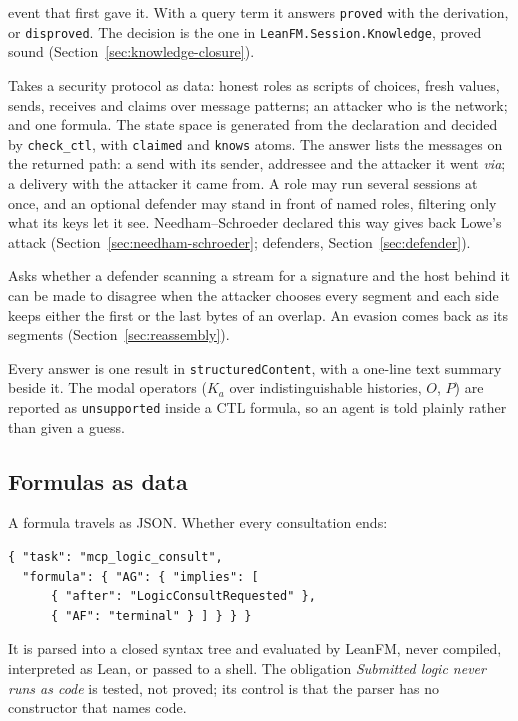 \begin{description}[style=nextline]
event that first gave it. With a query term it answers \texttt{proved} with the
derivation, or \texttt{disproved}. The decision is the one in
\texttt{LeanFM.Session.Knowledge}, proved sound
(Section~\ref{sec:knowledge-closure}).
\item[\texttt{check\_protocol}] Takes a security protocol as data: honest roles
as scripts of choices, fresh values, sends, receives and claims over message
patterns; an attacker who is the network; and one formula. The state space is
generated from the declaration and decided by \texttt{check\_ctl}, with
\texttt{claimed} and \texttt{knows} atoms. The answer lists the messages on the
returned path: a send with its sender, addressee and the attacker it went
\emph{via}; a delivery with the attacker it came from. A role may run several
sessions at once, and an optional defender may stand in front of named roles,
filtering only what its keys let it see. Needham--Schroeder declared this way
gives back Lowe's attack (Section~\ref{sec:needham-schroeder}; defenders,
Section~\ref{sec:defender}).
\item[\texttt{check\_reassembly}] Asks whether a defender scanning a stream for a
signature and the host behind it can be made to disagree when the attacker
chooses every segment and each side keeps either the first or the last bytes of
an overlap. An evasion comes back as its segments
(Section~\ref{sec:reassembly}).
\end{description}

Every answer is one result in \texttt{structuredContent}, with a one-line text
summary beside it. The modal operators ($K_a$ over indistinguishable histories,
$O$, $P$) are reported as \texttt{unsupported} inside a CTL formula, so an agent
is told plainly rather than given a guess.

\subsection{Formulas as data}

A formula travels as JSON. Whether every consultation ends:

\begin{lstlisting}
{ "task": "mcp_logic_consult",
  "formula": { "AG": { "implies": [
      { "after": "LogicConsultRequested" },
      { "AF": "terminal" } ] } } }
\end{lstlisting}

It is parsed into a closed syntax tree and evaluated by LeanFM, never compiled,
interpreted as Lean, or passed to a shell. The obligation \emph{Submitted logic
never runs as code} is tested, not proved; its control is that the parser has no
constructor that names code.

